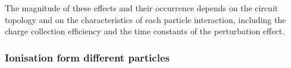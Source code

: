 The magnitude of these effects and their occurrence depends on the circuit topology and on the characteristics of each particle interaction, including the charge collection efficiency and the time constants of the perturbation effect. 

\subsubsection{Ionisation form different particles}
\label{subsubsec:SEE with Heavy Ions}

\begin{figure}
    \centering
    \hspace{0.1cm}
    \hspace{0.1cm}

\end{figure}
